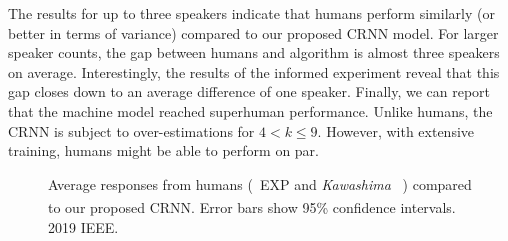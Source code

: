  The results for up to three speakers indicate that humans perform similarly (or better in terms of variance) compared to our proposed CRNN model.
 For larger speaker counts, the gap between humans and algorithm is almost three speakers on average.
 Interestingly, the results of the informed experiment reveal that this gap closes down to an average difference of one speaker.
 Finally, we can report that the machine model reached superhuman performance.
 Unlike humans, the CRNN is subject to over-estimations for \(4 < k \leq 9\).
 However, with extensive training, humans might be able to perform on par.
 
\begin{figure}[t!]
   \centering
   \begin{adjustbox}{width=0.7\columnwidth}
     
   \end{adjustbox}
   \caption{Average responses from humans (\
   {EXP} and \emph{Kawashima}
~\cite{kawashima15}) compared to our proposed CRNN. Error bars show 95\% confidence intervals. \textsuperscript{\textregistered} 2019 IEEE.}%
   \label{fig:experiment}
\end{figure}

